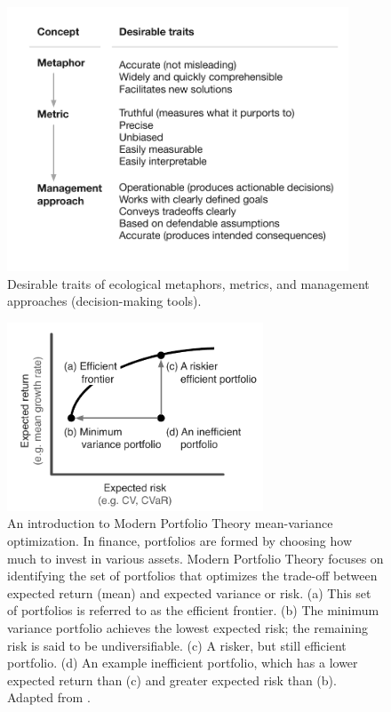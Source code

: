 \begin{figure}[htbp]
\centering
\includegraphics[width=4in]{mmm-traits.pdf}
\caption{
Desirable traits of ecological metaphors, metrics, and management approaches
(decision-making tools).
}
\label{fig:traits}
\end{figure}

\clearpage

\begin{figure}[htbp]
\centering
\includegraphics[width=3in]{efficient-frontier-fig.pdf}
\caption{
An introduction to Modern Portfolio Theory mean-variance optimization. In
finance, portfolios are formed by choosing how much to invest in various
assets. Modern Portfolio Theory focuses on identifying the set of portfolios
that optimizes the trade-off between expected return (mean) and expected
variance or risk. (a) This set of portfolios is referred to as the efficient
frontier. (b) The minimum variance portfolio achieves the lowest expected
risk; the remaining risk is said to be undiversifiable. (c) A risker, but
still efficient portfolio. (d) An example inefficient portfolio, which has a
lower expected return than (c) and greater expected risk than (b). Adapted
from \citet{hoekstra2012}.
}
\label{fig:mpt}
\end{figure}

